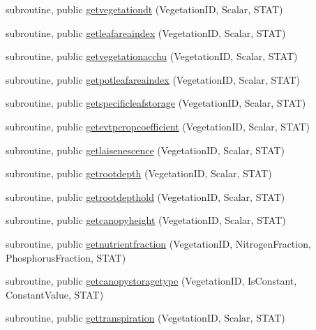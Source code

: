 \begin{DoxyCompactItemize}
\item 
subroutine, public \mbox{\hyperlink{namespacemodulevegetation_a357b84bec55907c71de65f8c878020f2}{getvegetationdt}} (Vegetation\+ID, Scalar, S\+T\+AT)
\item 
subroutine, public \mbox{\hyperlink{namespacemodulevegetation_acf7940a010ec79861c9eaee61e66b333}{getleafareaindex}} (Vegetation\+ID, Scalar, S\+T\+AT)
\item 
subroutine, public \mbox{\hyperlink{namespacemodulevegetation_a9c5cba62246c38a0de1aebb1aaa788d6}{getvegetationacchu}} (Vegetation\+ID, Scalar, S\+T\+AT)
\item 
subroutine, public \mbox{\hyperlink{namespacemodulevegetation_a135c6aa1fdf9824ab93f467c026a344f}{getpotleafareaindex}} (Vegetation\+ID, Scalar, S\+T\+AT)
\item 
subroutine, public \mbox{\hyperlink{namespacemodulevegetation_aefe8dd6c224ba5b203b6c1be059d23e7}{getspecificleafstorage}} (Vegetation\+ID, Scalar, S\+T\+AT)
\item 
subroutine, public \mbox{\hyperlink{namespacemodulevegetation_ac3fe071c0a204afbed0b3414ecb4e09d}{getevtpcropcoefficient}} (Vegetation\+ID, Scalar, S\+T\+AT)
\item 
subroutine, public \mbox{\hyperlink{namespacemodulevegetation_a91f1942c40129d70091dd872f5f926ae}{getlaisenescence}} (Vegetation\+ID, Scalar, S\+T\+AT)
\item 
subroutine, public \mbox{\hyperlink{namespacemodulevegetation_a4eb34f9d9a6f4daecca56ea8f69b25b3}{getrootdepth}} (Vegetation\+ID, Scalar, S\+T\+AT)
\item 
subroutine, public \mbox{\hyperlink{namespacemodulevegetation_a09efc99ad0002ea520622c460b1b067d}{getrootdepthold}} (Vegetation\+ID, Scalar, S\+T\+AT)
\item 
subroutine, public \mbox{\hyperlink{namespacemodulevegetation_af38b12fb3f6aba5eaf0e0153c1a5cf5b}{getcanopyheight}} (Vegetation\+ID, Scalar, S\+T\+AT)
\item 
subroutine, public \mbox{\hyperlink{namespacemodulevegetation_afcdcb6390a6a25bc7c5e5d70525ac36d}{getnutrientfraction}} (Vegetation\+ID, Nitrogen\+Fraction, Phosphorus\+Fraction, S\+T\+AT)
\item 
subroutine, public \mbox{\hyperlink{namespacemodulevegetation_a518c8834ccdc068342976e2fb709d93e}{getcanopystoragetype}} (Vegetation\+ID, Is\+Constant, Constant\+Value, S\+T\+AT)
\item 
subroutine, public \mbox{\hyperlink{namespacemodulevegetation_a016291d4e7aeb601c4e8ad878693cce7}{gettranspiration}} (Vegetation\+ID, Scalar, S\+T\+AT)

\end{DoxyCompactItemize}

